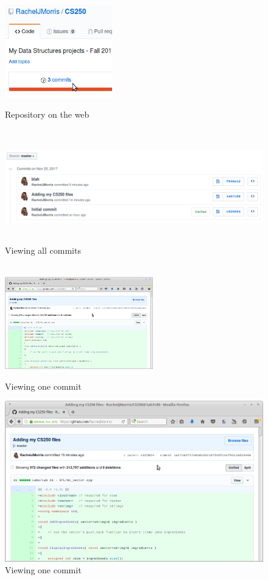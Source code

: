 \documentclass[a4paper,12pt,oneside]{book}
\begin{document}
        \begin{figure}[h]
            \centering
            \includegraphics[height=4cm]{images/github-commits.png}
            \caption{Repository on the web}
            
            ~\\
            \includegraphics[height=4cm]{images/github-commits2.png}
            \caption{Viewing all commits}

            ~\\
            \includegraphics[height=4cm]{images/github-commits3.png}
            \caption{Viewing one commit}
        \end{figure}

    \newpage
        
        \begin{figure}[h]
            \centering
            \includegraphics[width=14cm]{images/github-commits3.png}
            \caption{Viewing one commit}
        \end{figure}
\end{document}
